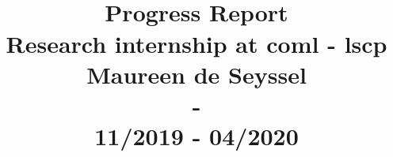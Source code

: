 \documentclass[12pt]{report}
\begin{document}

\renewcommand{\baselinestretch}{1.5}


\title{%
\hrulefill \\
  \textbf{Progress Report} \\
  \LARGE
\textbf{Research internship at \acrshort{coml} - \acrshort{lscp}} \\ Maureen de Seyssel \\ - \\ \large 11/2019 - 04/2020 \\
\hrulefill }

\author{}
\date{}

\maketitle\vspace{-2cm}

\thispagestyle{fancy}


\tableofcontents
\printglossaries














\end{document}
